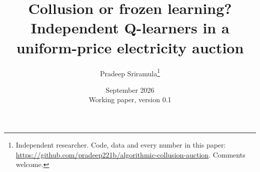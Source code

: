 \documentclass[11pt,a4paper]{article}
\title{Collusion or frozen learning?\\ \large Independent Q-learners in a uniform-price electricity auction}
\author{Pradeep Sriramula\thanks{Independent researcher. Code, data and every number in this paper:
\url{https://github.com/pradeep221b/algorithmic-collusion-auction}. Comments welcome.}}
\date{September 2026 \\ \small Working paper, version 0.1}
\begin{document}
\maketitle

\begin{abstract}

\end{abstract}













\appendix

\end{document}
